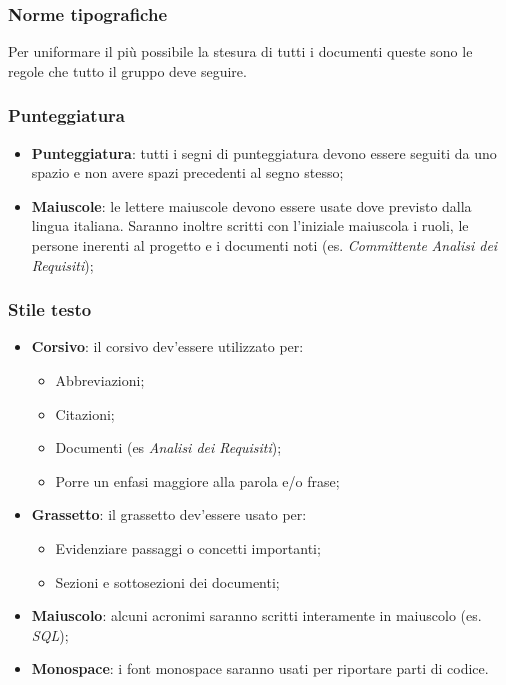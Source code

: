 \documentclass{scalatekids-article}
\begin{document}
\subsubsection{Norme tipografiche}
Per uniformare il più possibile la stesura di tutti i documenti queste sono le regole che tutto il gruppo deve seguire.

\subsubsection{Punteggiatura}
\begin{itemize}
\item \textbf{Punteggiatura}: tutti i segni di punteggiatura devono essere seguiti da uno spazio e non avere spazi precedenti al segno stesso;
\item \textbf{Maiuscole}: le lettere maiuscole devono essere usate dove previsto dalla lingua italiana.
  Saranno inoltre scritti con l'iniziale maiuscola i ruoli, le persone inerenti al progetto e i documenti noti (es. \textit{Committente} \textit{Analisi dei Requisiti});
\end{itemize}

\subsubsection{Stile testo}
\begin{itemize}
\item \textbf{Corsivo}: il corsivo dev'essere utilizzato per:
  \begin{itemize}
  \item Abbreviazioni;
  \item Citazioni;
  \item Documenti (es \textit{Analisi dei Requisiti});
  \item Porre un enfasi maggiore alla parola e/o frase;
  \end{itemize}
\item \textbf{Grassetto}: il grassetto dev'essere usato per:
  \begin{itemize}
  \item Evidenziare passaggi o concetti importanti;
  \item Sezioni e sottosezioni dei documenti;
  \end{itemize}
\item \textbf{Maiuscolo}: alcuni acronimi saranno scritti interamente in maiuscolo (es. \textit{SQL});
\item \textbf{Monospace}: i font monospace saranno usati per riportare parti di codice.
\end{itemize}
\end{document}
